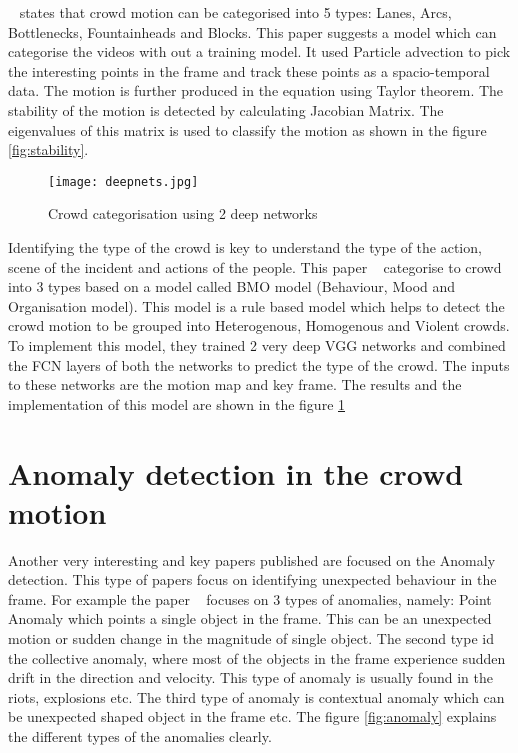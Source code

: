 ~\cite{solmaz2012identifying} states that crowd motion can be categorised into 5 types: Lanes, Arcs, 
Bottlenecks, Fountainheads and Blocks. This paper suggests a model which can categorise the videos 
with out a training model. It used Particle advection to pick the interesting points in the frame and track 
these points as a spacio-temporal data. The motion is further produced in the equation using Taylor 
theorem. The stability of the motion is detected by calculating Jacobian Matrix. The eigenvalues of this 
matrix is used to classify the motion as shown in the figure \ref{fig:stability}.

\begin{figure}[tb]
	\center\texttt{[image: deepnets.jpg]}
	\caption{Crowd categorisation using 2 deep networks ~\cite{wei2020very} }
	\label{fig:2deep}
\end{figure}

Identifying the type of the crowd is key to understand the type of the action, scene of the incident and 
actions of the people. This paper ~\cite{wei2020very} categorise to crowd into 3 types based on a 
model called BMO model (Behaviour, Mood and Organisation model). This model is a rule based model 
which helps to detect the crowd motion to be grouped into Heterogenous, Homogenous and Violent 
crowds. To implement this model, they trained 2 very deep VGG networks and combined the FCN 
layers of both the networks to predict the type of the crowd. The inputs to these networks are the motion 
map and key frame. The results and the implementation of this model are shown in the figure 
\ref{fig:2deep}

\section{Anomaly detection in the crowd motion}
Another very interesting and key papers published are focused on the Anomaly detection. This type of papers focus on identifying unexpected behaviour in the frame. For example the paper ~\cite{bansod2020crowd} focuses on 3 types of anomalies, namely: Point Anomaly which points a single object in the frame. This can be an unexpected motion or sudden change in the magnitude of single object. The second type id the collective anomaly, where most of the objects in the frame experience sudden drift in the direction and velocity. This type of anomaly is usually found in the riots, explosions etc. The third type of anomaly is contextual anomaly which can be unexpected shaped object in the frame etc. The figure \ref{fig:anomaly} explains the different types of the anomalies clearly.

